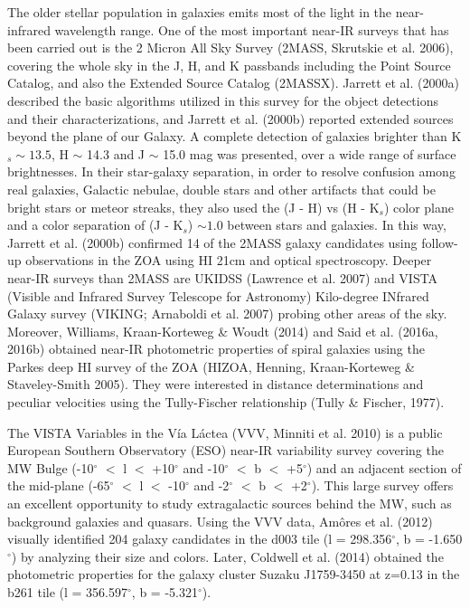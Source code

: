 \documentclass[preprint2]{aastex}
\begin{document}
 The older stellar population in galaxies emits most of the light in the near-infrared wavelength range. 
One of the most important near-IR surveys that has been carried out is 
the 2 Micron All Sky Survey (2MASS, Skrutskie et al. 2006),
covering the whole sky in the J, H, and K passbands  including 
the Point Source Catalog, and also the Extended Source Catalog (2MASSX).
Jarrett et al. (2000a) described the basic algorithms utilized in this survey
for the 
object detections and their characterizations, and Jarrett et al. (2000b)
reported extended sources beyond the 
plane of our Galaxy.
A complete detection of galaxies brighter than K$_s \sim 13.5$, 
H $\sim$ 14.3 and
J $\sim$ 15.0 mag was presented, over a wide range of surface brightnesses.  
In their star-galaxy separation, in order to resolve confusion among real
galaxies, 
Galactic nebulae, double stars
and other artifacts that could be bright stars or meteor streaks, they also
used the (J - H) vs (H - K$_s$) color plane and a color separation of 
(J - K$_s$) $ \sim 1.0$ between stars and galaxies. In this way,
Jarrett et al. (2000b) confirmed 14 of the 2MASS galaxy candidates using 
follow-up observations in the ZOA using 
HI 21cm and optical spectroscopy.  Deeper near-IR surveys than 2MASS are
UKIDSS (Lawrence et al. 2007) and
VISTA  (Visible and Infrared Survey Telescope
for Astronomy) Kilo-degree INfrared Galaxy survey
(VIKING; Arnaboldi et al. 2007) probing other areas of the
sky.    Moreover, Williams, Kraan-Korteweg \& Woudt (2014)
and Said et al. (2016a, 2016b) 
obtained 
near-IR photometric properties of spiral galaxies using the Parkes 
deep HI survey of the ZOA (HIZOA, Henning, Kraan-Korteweg \& Staveley-Smith
2005). They  were interested in 
distance determinations and peculiar velocities using the Tully-Fischer
relationship (Tully \& Fischer, 1977).

The VISTA Variables in the 
V\'ia L\'actea (VVV, Minniti et al. 2010) is 
a public European Southern Observatory (ESO) near-IR variability survey covering the MW Bulge 
 (-10$^{\circ}$ $<$ l $<$ +10$^{\circ}$ and -10$^{\circ}$ $<$ b $<$ +5$^{\circ}$) and an 
adjacent section of the mid-plane (-65$^{\circ}$ $<$ l $<$ -10$^{\circ}$ and 
-2$^{\circ}$ $<$ b $<$ +2$^{\circ}$).  This large survey offers an excellent
opportunity to study extragalactic sources 
behind the MW, such as background galaxies and quasars.  
Using the VVV data, Am{\^o}res et al. (2012) visually identified 
204 galaxy candidates in the d003 tile
(l = 298.356$^{\circ}$, b = -1.650$^{\circ}$) by analyzing their size and colors.
Later, Coldwell et al. (2014) obtained the photometric properties 
for the galaxy cluster Suzaku J1759-3450 at z=0.13 in the b261 tile
(l = 356.597$^{\circ}$, b = -5.321$^{\circ}$).
\end{document}
